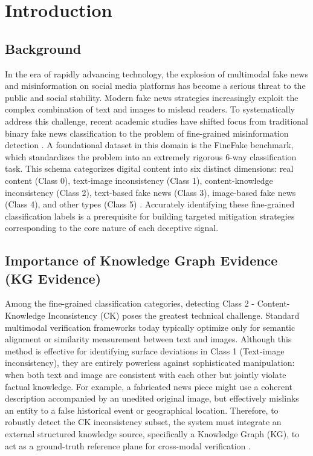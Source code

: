 \section{Introduction}

\subsection{Background}
In the era of rapidly advancing technology, the explosion of multimodal fake news and misinformation on social media platforms has become a serious threat to the public and social stability. Modern fake news strategies increasingly exploit the complex combination of text and images to mislead readers. To systematically address this challenge, recent academic studies have shifted focus from traditional binary fake news classification to the problem of fine-grained misinformation detection \cite{ref1, ref2}. A foundational dataset in this domain is the FineFake benchmark, which standardizes the problem into an extremely rigorous 6-way classification task. This schema categorizes digital content into six distinct dimensions: real content (Class 0), text-image inconsistency (Class 1), content-knowledge inconsistency (Class 2), text-based fake news (Class 3), image-based fake news (Class 4), and other types (Class 5) \cite{ref3}. Accurately identifying these fine-grained classification labels is a prerequisite for building targeted mitigation strategies corresponding to the core nature of each deceptive signal.

\subsection{Importance of Knowledge Graph Evidence (KG Evidence)}
Among the fine-grained classification categories, detecting Class 2 - Content-Knowledge Inconsistency (CK) poses the greatest technical challenge. Standard multimodal verification frameworks today typically optimize only for semantic alignment or similarity measurement between text and images. Although this method is effective for identifying surface deviations in Class 1 (Text-image inconsistency), they are entirely powerless against sophisticated manipulation: when both text and image are consistent with each other but jointly violate factual knowledge. For example, a fabricated news piece might use a coherent description accompanied by an unedited original image, but effectively mislinks an entity to a false historical event or geographical location. Therefore, to robustly detect the CK inconsistency subset, the system must integrate an external structured knowledge source, specifically a Knowledge Graph (KG), to act as a ground-truth reference plane for cross-modal verification \cite{ref4}.

